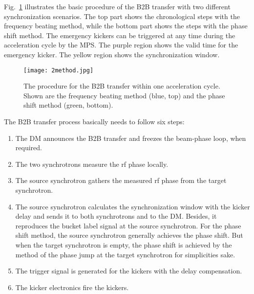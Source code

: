 Fig.~\ref{2method} illustrates the basic procedure of the B2B transfer with two different synchronization scenarios. The top part shows the chronological steps with the frequency beating method, while the bottom part shows the steps with the phase shift method. The emergency kickers can be triggered at any time during the acceleration cycle by the MPS. The purple region shows the valid time for the emergency kicker. The yellow region shows the synchronization window. 
\begin{figure}[H]
   \centering   
   \texttt{[image: 2method.jpg]}
   \caption{The procedure for the B2B transfer within one acceleration cycle. Shown are the frequency beating method (blue, top) and the phase shift method (green, bottom).}
   \label{2method}
\end{figure}

The B2B transfer process basically needs to follow six steps:
\begin{enumerate}
\item The DM announces the B2B transfer and freezes the beam-phase loop, when required.
\item The two synchrotrons measure the rf phase locally.
\item The source synchrotron gathers the measured rf phase from the target synchrotron.
\item The source synchrotron calculates the synchronization window with the kicker delay and sends it to both synchrotrons and to the DM. Besides, it reproduces the bucket label signal at the source synchrotron.
For the phase shift method, the source synchrotron generally achieves the phase shift. But when the target synchrotron is empty, the phase shift is achieved by the method of the phase jump at the target synchrotron for simplicities sake.
\item The trigger signal is generated for the kickers with the delay compensation.
\item The kicker electronics fire the kickers.
\end{enumerate}

